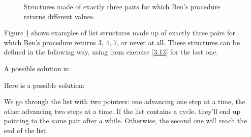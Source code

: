 \begin{exe}[3.16]
\begin{figure}
        \caption{Structures made of exactly three pairs for which Ben’s 
            procedure returns different values.}
        \label{3.16ex}
    \end{figure}
    Figure \ref{3.16ex} shows examples of list structures made up of exactly 
    three pairs for which Ben’s procedure returns 3, 4, 7, or never at all.
    These structures can be defined in the following way, using 
     from exercise \ref{3.13} for the last one.
\end{exe}

\begin{exe}[3.17]
    A possible solution is:
\end{exe}

\begin{exe}[3.18]
    Here is a possible solution:
\end{exe}

\begin{exe}[3.19]
    We go through the list with two pointers: one advancing one step at a time, 
    the other advancing two steps at a time. If the list contains a cycle, 
    they’ll end up pointing to the same pair after a while. Otherwise, the 
    second one will reach the end of the list.
\end{exe}


